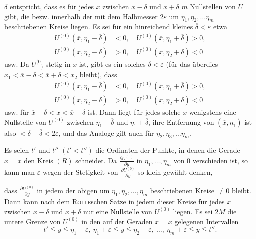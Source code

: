 \(\delta\) entspricht, dass es für jedes \(x\) zwischen \(\overline x-\delta\) und \(\overline x+\delta\) \(m\) Nullstellen von
\(U\) gibt, die bezw. innerhalb der mit dem Halbmesser \(2\varepsilon\) um \(\eta_1,\eta_2,\ldots\eta_m\) beschriebenen
Kreise liegen. Es sei für ein hinreichend kleines \(\overline\delta<\varepsilon\) etwa
\[
\begin{aligned}
U^{(0)}(\overline x,\eta_1-\overline\delta)&<0,\quad U^{(0)}(\overline x,\eta_1+\overline\delta)>0,\\
U^{(0)}(\overline x,\eta_2-\overline\delta)&>0,\quad U^{(0)}(\overline x,\eta_2+\overline\delta)<0
\end{aligned}
\]
usw. Da \(U^{(0}{}_{)}\) stetig in \(x\) ist, gibt es ein solches \(\delta<\varepsilon\) (für das überdies
\(x_1<\overline x-\delta<\overline x+\delta<x_2\) bleibt), dass
\[
\begin{aligned}
U^{(0)}(x,\eta_1-\overline\delta)&<0,\quad U^{(0)}(x,\eta_1+\overline\delta)>0,\\
U^{(0)}(x,\eta_2-\overline\delta)&>0,\quad U^{(0)}(x,\eta_2+\overline\delta)<0
\end{aligned}
\]
usw. für \(\overline x-\delta<x<\overline x+\delta\) ist. Dann liegt für jedes solche \(x\) wenigstens
eine Nullstelle von \(U^{(0)}\) zwischen \(\eta_1-\overline\delta\) und \(\eta_1+\overline\delta\), ihre Entfernung von \((\overline x,\eta_1)\)
ist also \(<\delta+\overline\delta<2\varepsilon\), und das Analoge gilt auch für \(\eta_2,\eta_3,\ldots\eta_m\).
\par
Es seien \(t'\) und \(t''\) \((t'<t'')\) die Ordinaten der Punkte, in denen die Gerade
\(x=\overline x\) den Kreis \((R)\) schneidet. Da \(\frac{\partial U^{(0)}}{\partial y}\) in \(\eta_1,\ldots,\eta_m\) von 0 verschieden
ist, so kann man \(\varepsilon\) wegen der Stetigkeit von \(\frac{\partial U^{(0)}}{\partial y}\) so klein gewählt denken,\par
\clearpage{}
\noindent dass \(\frac{\partial U^{(0)}}{\partial y}\) in jedem der obigen um \(\eta_1,\eta_2,\ldots,\eta_m\) beschriebenen Kreise \(\ne0\)
bleibt. Dann kann nach dem \textsc{Rolle}schen Satze in jedem dieser Kreise für
jedes \(x\) zwischen \(\overline x-\delta\) und \(\overline x+\delta\) nur eine Nullstelle von \(U^{(0)}\) liegen. Es sei
\(2M\) die untere Grenze von \(U^{(0)}\) in den auf der Geraden \(x=\overline x\) gelegenen Intervallen
\[
t'\leqq y\leqq\eta_1-\varepsilon,\ \eta_1+\varepsilon\leqq y\leqq\eta_2-\varepsilon,\ \ldots,\ \eta_m+\varepsilon\leqq y\leqq t''.
\]
